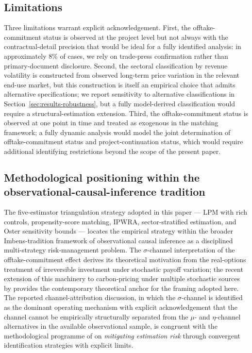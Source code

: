 \documentclass[12pt,a4paper]{article}
\theoremstyle{plain}
\theoremstyle{definition}
\begin{document}
\subsection{Limitations}
\label{sec:discussion-limitations}

Three limitations warrant explicit acknowledgement. First, the offtake-commitment status is observed at the project level but not always with the contractual-detail precision that would be ideal for a fully identified analysis: in approximately 8\% of cases, we rely on trade-press confirmation rather than primary-document disclosure. Second, the sectoral classification by revenue volatility is constructed from observed long-term price variation in the relevant end-use market, but this construction is itself an empirical choice that admits alternative specifications; we report sensitivity to alternative classifications in Section~\ref{sec:results-robustness}, but a fully model-derived classification would require a structural-estimation extension. Third, the offtake-commitment status is observed at one point in time and treated as exogenous in the matching framework; a fully dynamic analysis would model the joint determination of offtake-commitment status and project-continuation status, which would require additional identifying restrictions beyond the scope of the present paper.

\subsection{Methodological positioning within the observational-causal-inference tradition}
\label{sec:p3-method-positioning}

The five-estimator triangulation strategy adopted in this paper --- LPM with rich controls, propensity-score matching, IPWRA, sector-stratified estimation, and Oster sensitivity bounds --- locates the empirical strategy within the broader Imbens-tradition framework of observational causal inference \cite{imbens2018causal} as a disciplined multi-strategy risk-management problem. The $\sigma$-channel interpretation of the offtake-commitment effect derives its theoretical motivation from the real-options treatment of irreversible investment under stochastic payoff variation; the recent extension of this machinery to carbon-pricing under multiple stochastic sources by \citet{olijslagers2021carbon} provides the contemporary theoretical anchor for the framing adopted here. The reported channel-attribution discussion, in which the $\sigma$-channel is identified as the dominant operating mechanism with explicit acknowledgement that the channel cannot be empirically structurally separated from the $\mu$- and $\eta$-channel alternatives in the available observational sample, is congruent with the methodological programme of \citet{blasques2024mitigating} on \emph{mitigating estimation risk} through convergent identification strategies with explicit limits.
\end{document}
